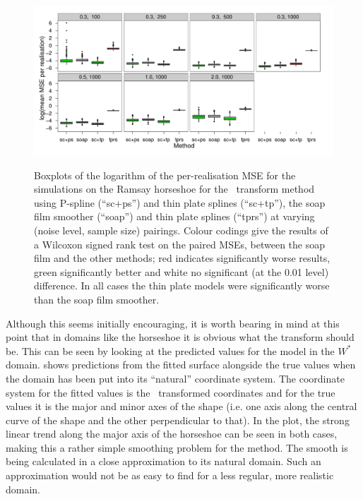 \begin{figure}
\centering
\includegraphics{sc/tablecode/ramsay-boxplot.pdf} \\
\caption{Boxplots of the logarithm of the per-realisation MSE for the simulations on the Ramsay horseshoe for the \sch\ transform method using P-spline (``sc+ps'') and thin plate splines (``sc+tp''), the soap film smoother (``soap'') and thin plate splines (``tprs'') at varying (noise level, sample size) pairings. Colour codings give the results of a Wilcoxon signed rank test on the paired MSEs, between the soap film and the other methods; red indicates significantly worse results, green significantly better and white no significant (at the 0.01 level) difference. In all cases the thin plate models were significantly worse than the soap film smoother.}
\label{sc-ram-boxplot}
\end{figure}


Although this seems initially encouraging, it is worth bearing in mind at this point that in domains like the horseshoe it is obvious what the transform should be. This can be seen by looking at the predicted values for the model in the $W^*$ domain.  shows predictions from the fitted surface alongside the true values when the domain has been put into its ``natural'' coordinate system. The coordinate system for the fitted values is the \sch\ transformed coordinates and for the true values it is the major and minor axes of the shape (i.e. one axis along the central curve of the shape and the other perpendicular to that). In the plot, the strong linear trend along the major axis of the horseshoe can be seen in both cases, making this a rather simple smoothing problem for the method. The smooth is being calculated in a close approximation to its natural domain. Such an approximation would not be as easy to find for a less regular, more realistic domain.

